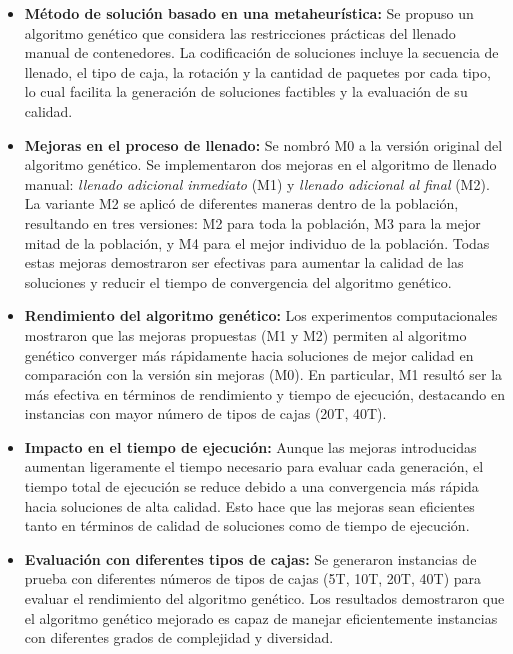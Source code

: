\documentclass[openany]{article}
\begin{document}
\begin{itemize}
    \item \textbf{Método de solución basado en una metaheurística:} Se propuso un algoritmo genético que considera las restricciones prácticas del llenado manual de contenedores. La codificación de soluciones incluye la secuencia de llenado, el tipo de caja, la rotación y la cantidad de paquetes por cada tipo, lo cual facilita la generación de soluciones factibles y la evaluación de su calidad.
    \item \textbf{Mejoras en el proceso de llenado:} Se nombró M0 a la versión original del algoritmo genético. Se implementaron dos mejoras en el algoritmo de llenado manual: \textit{llenado adicional inmediato} (M1) y \textit{llenado adicional al final} (M2). La variante M2 se aplicó de diferentes maneras dentro de la población, resultando en tres versiones: M2 para toda la población, M3 para la mejor mitad de la población, y M4 para el mejor individuo de la población. Todas estas mejoras demostraron ser efectivas para aumentar la calidad de las soluciones y reducir el tiempo de convergencia del algoritmo genético.

    \item \textbf{Rendimiento del algoritmo genético:} Los experimentos computacionales mostraron que las mejoras propuestas (M1 y M2) permiten al algoritmo genético converger más rápidamente hacia soluciones de mejor calidad en comparación con la versión sin mejoras (M0). En particular, M1 resultó ser la más efectiva en términos de rendimiento y tiempo de ejecución, destacando en instancias con mayor número de tipos de cajas (20T, 40T).

    \item \textbf{Impacto en el tiempo de ejecución:} Aunque las mejoras introducidas aumentan ligeramente el tiempo necesario para evaluar cada generación, el tiempo total de ejecución se reduce debido a una convergencia más rápida hacia soluciones de alta calidad. Esto hace que las mejoras sean eficientes tanto en términos de calidad de soluciones como de tiempo de ejecución.

    \item \textbf{Evaluación con diferentes tipos de cajas:} Se generaron instancias de prueba con diferentes números de tipos de cajas (5T, 10T, 20T, 40T) para evaluar el rendimiento del algoritmo genético. Los resultados demostraron que el algoritmo genético mejorado es capaz de manejar eficientemente instancias con diferentes grados de complejidad y diversidad.
\end{itemize}
\end{document}
